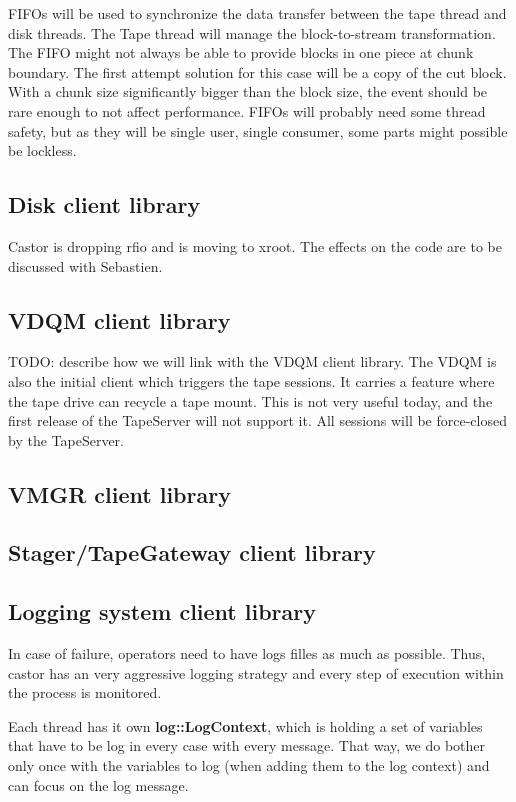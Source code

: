 FIFOs will be used to synchronize the data transfer between the tape thread and 
disk threads. The Tape thread will manage the block-to-stream transformation. The
FIFO might not always be able to provide blocks in one piece at chunk boundary.
The first attempt solution for this case will be a copy of the cut block. With
a chunk size significantly bigger than the block size, the event should be rare
enough to not affect performance. FIFOs will probably need some thread safety,
but as they will be single user, single consumer, some parts might possible 
be lockless.

\subsection{Disk client library}
Castor is dropping rfio and is moving to xroot. The effects on the code are to be
discussed with Sebastien.
\subsection{VDQM client library}

TODO: describe how we will link with the VDQM client library. The VDQM is also 
the initial client which triggers the tape sessions. It carries a feature
where the tape drive can recycle a tape mount. This is not very useful today,
and the first release of the TapeServer will not support it. All sessions
will be force-closed by the TapeServer.

\subsection{VMGR client library}

\subsection{Stager/TapeGateway client library}

\subsection{Logging system client library}
In case of failure,  operators need to have logs filles as much as possible. 
Thus, castor has an very aggressive logging strategy and every step of execution within the process 
is monitored.

Each thread has it own \textbf{log::LogContext}, which is holding a set of variables that have to be log in every case 
with every message. That way, we do bother only once with the variables to 
log (when adding them to the log context) and can focus on the log message.


